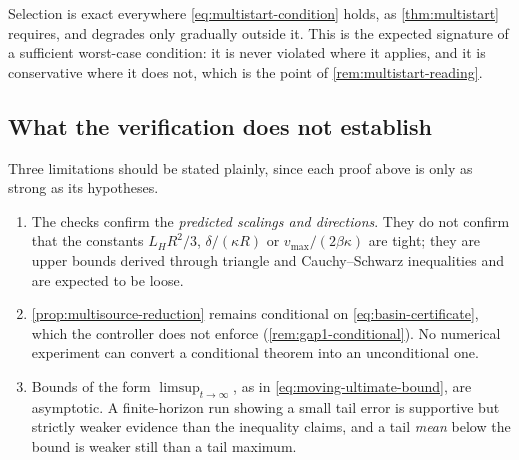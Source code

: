 \documentclass[11pt,a4paper]{article}
\theoremstyle{plain}
\theoremstyle{definition}
\begin{document}
Selection is exact everywhere \eqref{eq:multistart-condition} holds, as \cref{thm:multistart}
requires, and degrades only gradually outside it. This is the expected signature of a sufficient
worst-case condition: it is never violated where it applies, and it is conservative where it does
not, which is the point of \cref{rem:multistart-reading}.

\subsection{What the verification does not establish}\label{sec:gap3-limits}

Three limitations should be stated plainly, since each proof above is only as strong as its
hypotheses.

\begin{enumerate}[label=\arabic*.,nosep]
    \item The checks confirm the \emph{predicted scalings and directions}. They do not confirm
    that the constants $L_HR^2/3$, $\delta/(\kappa R)$ or $v_{\max}/(2\beta\kappa)$ are tight;
    they are upper bounds derived through triangle and Cauchy--Schwarz inequalities and are
    expected to be loose.
    \item \cref{prop:multisource-reduction} remains conditional on
    \eqref{eq:basin-certificate}, which the controller does not enforce
    (\cref{rem:gap1-conditional}). No numerical experiment can convert a conditional theorem into
    an unconditional one.
    \item Bounds of the form $\limsup_{t\to\infty}$, as in \eqref{eq:moving-ultimate-bound}, are
    asymptotic. A finite-horizon run showing a small tail error is supportive but strictly weaker
    evidence than the inequality claims, and a tail \emph{mean} below the bound is weaker still
    than a tail maximum.
\end{enumerate}
\end{document}
